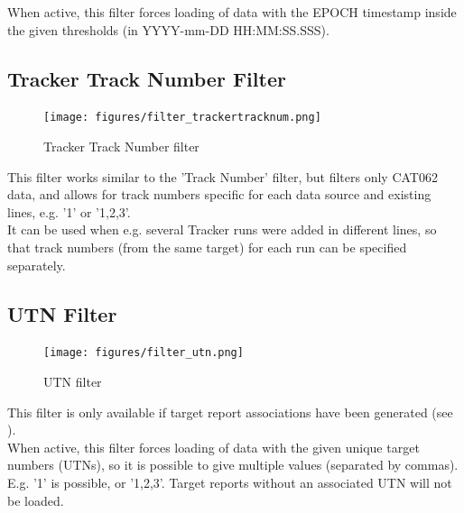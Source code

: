 When active, this filter forces loading of data with the EPOCH timestamp inside the given thresholds (in YYYY-mm-DD HH:MM:SS.SSS).


% 
% 
% 
% 
\subsection{Tracker Track Number Filter}

\begin{figure}[H]
  \center
    \texttt{[image: figures/filter\_trackertracknum.png]}
  \caption{Tracker Track Number filter}
\end{figure}

This filter works similar to the 'Track Number' filter, but filters only CAT062 data, and allows for track numbers specific for each data source and existing lines, e.g. '1' or '1,2,3'.\\

It can be used when e.g. several Tracker runs were added in different lines, so that track numbers (from the same target) for each run can be specified separately. \\

\subsection{UTN Filter}

\begin{figure}[H]
  \center
    \texttt{[image: figures/filter\_utn.png]}
  \caption{UTN filter}
\end{figure}

This filter is only available if target report associations have been generated (see ). \\

When active, this filter forces loading of data with the given unique target numbers (UTNs), so it is possible to give multiple values (separated by commas). E.g. '1' is possible, or '1,2,3'. Target reports without an associated UTN will not be loaded. \\

